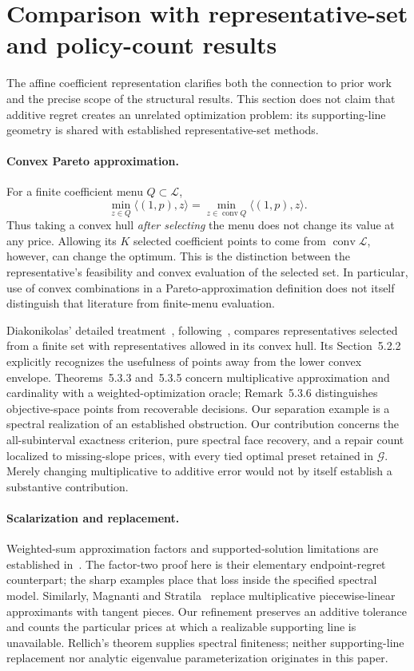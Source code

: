 \section{Comparison with representative-set and policy-count results}
\label{app:comparison}
The affine coefficient representation clarifies both the connection to
prior work and the precise scope of the structural results. This section
does not claim that additive regret creates an unrelated optimization
problem: its supporting-line geometry is shared with established
representative-set methods.

\paragraph{Convex Pareto approximation.}
For a finite coefficient menu $Q\subset\mathcal L$,
\[
 \min_{z\in Q}\langle(1,p),z\rangle
 =\min_{z\in\operatorname{conv}Q}\langle(1,p),z\rangle.
\]
Thus taking a convex hull \emph{after selecting} the menu does not change
its value at any price. Allowing its $K$ selected coefficient points to
come from $\operatorname{conv}\mathcal L$, however, can change the optimum.
This is the distinction between the representative's feasibility and
convex evaluation of the selected set. In particular, use of convex
combinations in a Pareto-approximation definition does not itself distinguish
that literature from finite-menu evaluation.

Diakonikolas' detailed treatment~\cite[Chapter~5]{diakonikolas2011},
following~\cite{diakonikolas2008}, compares representatives selected from
a finite set with representatives allowed in its convex hull. Its
Section~5.2.2 explicitly recognizes the usefulness of points away from
the lower convex envelope. Theorems~5.3.3 and~5.3.5 concern multiplicative
approximation and cardinality with a weighted-optimization oracle;
Remark~5.3.6 distinguishes objective-space points from recoverable decisions.
Our separation example is a spectral realization of an established
obstruction. Our contribution concerns the all-subinterval exactness
criterion, pure spectral face recovery, and a repair count localized to
missing-slope prices, with every tied optimal preset retained in
$\mathcal G$. Merely changing multiplicative to additive error would not
by itself establish a substantive contribution.

\paragraph{Scalarization and replacement.}
Weighted-sum approximation factors and supported-solution limitations
are established in~\cite{bazgan2022,helfrich2024}. The factor-two proof
here is their elementary endpoint-regret counterpart; the sharp examples
place that loss inside the specified spectral model. Similarly,
Magnanti and Stratila~\cite[Lemma~2]{magnanti2012} replace multiplicative
piecewise-linear approximants with tangent pieces. Our refinement preserves
an additive tolerance and counts the particular prices at which a
realizable supporting line is unavailable. Rellich's theorem supplies
spectral finiteness; neither supporting-line replacement nor analytic
eigenvalue parameterization originates in this paper.

